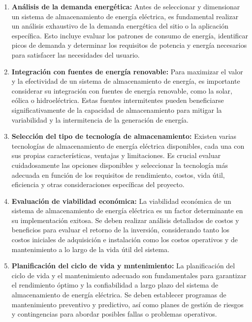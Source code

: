 \documentclass[11pt]{article}
\begin{document}
            \begin{enumerate}
                \item \textbf{Análisis de la demanda energética:} Antes de seleccionar y dimensionar un sistema de almacenamiento de energía eléctrica, es
                fundamental realizar un análisis exhaustivo de la demanda energética del sitio o la
                aplicación específica. Esto incluye evaluar los patrones de consumo de energía, identificar
                picos de demanda y determinar los requisitos de potencia y energía necesarios para
                satisfacer las necesidades del usuario.

                \item \textbf{Integración con fuentes de energía renovable:} Para maximizar el valor y la efectividad de un sistema de almacenamiento de energía, es
                importante considerar su integración con fuentes de energía renovable, como la solar, eólica
                o hidroeléctrica. Estas fuentes intermitentes pueden beneficiarse significativamente de la
                capacidad de almacenamiento para mitigar la variabilidad y la intermitencia de la generación
                de energía.

                \item \textbf{Selección del tipo de tecnología de almacenamiento:} Existen varias tecnologías de almacenamiento de energía eléctrica disponibles, cada una
                con sus propias características, ventajas y limitaciones. Es crucial evaluar cuidadosamente
                las opciones disponibles y seleccionar la tecnología más adecuada en función de los
                requisitos de rendimiento, costos, vida útil, eficiencia y otras consideraciones específicas del
                proyecto.

                \item \textbf{Evaluación de viabilidad económica:} La viabilidad económica de un sistema de almacenamiento de energía eléctrica es un factor
                determinante en su implementación exitosa. Se deben realizar análisis detallados de costos
                y beneficios para evaluar el retorno de la inversión, considerando tanto los costos iniciales
                de adquisición e instalación como los costos operativos y de mantenimiento a lo largo de la
                vida útil del sistema.

                \item \textbf{Planificación del ciclo de vida y mntenimiento:} La planificación del ciclo de vida y el mantenimiento adecuado son fundamentales para
                garantizar el rendimiento óptimo y la confiabilidad a largo plazo del sistema de
                almacenamiento de energía eléctrica. Se deben establecer programas de mantenimiento
                preventivo y predictivo, así como planes de gestión de riesgos y contingencias para abordar
                posibles fallas o problemas operativos. 

            \end{enumerate}
            
\end{document}

